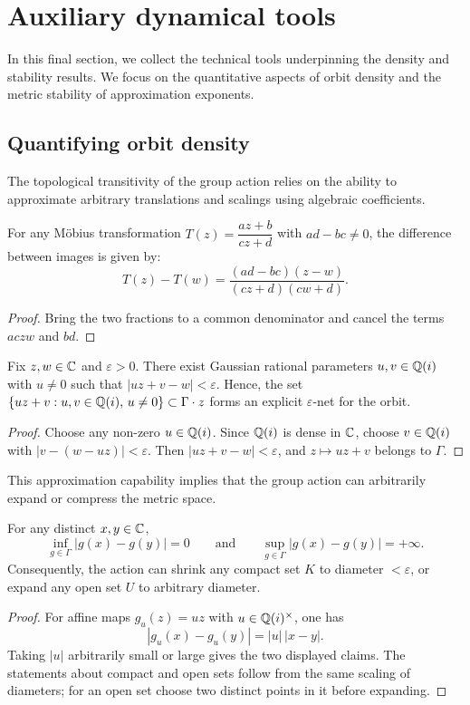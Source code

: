 \section{Auxiliary dynamical tools}\label{grct:sec:tools}

In this final section, we collect the technical tools underpinning the density and stability results. We focus on the quantitative aspects of orbit density and the metric stability of approximation exponents.

\subsection{Quantifying orbit density}

The topological transitivity of the group action relies on the ability to approximate arbitrary translations and scalings using algebraic coefficients.

\begin{lemma}\label{grct:lem:mob-difference}
	For any M\"obius transformation $T(z)=\dfrac{az+b}{cz+d}$ with $ad-bc\ne0$, the difference between images is given by:
	\[
		T(z)-T(w)=\frac{(ad-bc)(z-w)}{(cz+d)(cw+d)}.
	\]
\end{lemma}
\begin{proof}
	Bring the two fractions to a common denominator and cancel the terms $acz w$ and $bd$.
\end{proof}

\begin{theorem}\label{grct:thm:epsilon-net}
	Fix $z,w\in\mathbb{C}$ and $\varepsilon>0$. There exist Gaussian rational parameters $u,v\in\mathbb{Q}(i)$ with $u\neq0$ such that
	\(
	|uz+v-w|<\varepsilon.
	\)
	Hence, the set $\{uz+v:u,v\in\mathbb{Q}(i),\,u\ne0\}\subset\Gamma\cdot z$ forms an explicit $\varepsilon$-net for the orbit.
\end{theorem}
\begin{proof}
	Choose any non-zero $u\in\mathbb{Q}(i)$. Since $\mathbb{Q}(i)$ is dense in $\mathbb{C}$, choose $v\in\mathbb{Q}(i)$ with $|v-(w-uz)|<\varepsilon$. Then $|uz+v-w|<\varepsilon$, and $z\mapsto uz+v$ belongs to $\Gamma$.
\end{proof}

This approximation capability implies that the group action can arbitrarily expand or compress the metric space.

\begin{proposition}\label{grct:prop:coarse-expansion}
	For any distinct $x,y\in\mathbb{C}$,
	\[
		\inf_{g\in\Gamma}|g(x)-g(y)|=0
		\qquad\text{and}\qquad
		\sup_{g\in\Gamma}|g(x)-g(y)|=+\infty.
	\]
	Consequently, the action can shrink any compact set $K$ to diameter $<\varepsilon$, or expand any open set $U$ to arbitrary diameter.
\end{proposition}
\begin{proof}
	For affine maps $g_u(z)=uz$ with $u\in\mathbb{Q}(i)^\times$, one has
	\[
		|g_u(x)-g_u(y)|=|u|\,|x-y|.
	\]
	Taking $|u|$ arbitrarily small or large gives the two displayed claims. The statements about compact and open sets follow from the same scaling of diameters; for an open set choose two distinct points in it before expanding.
\end{proof}

